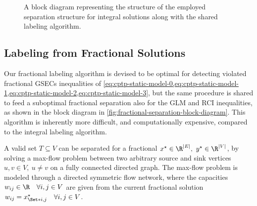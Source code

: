 \begin{figure}[ht]
	\centering
	\caption{A block diagram representing the structure
		of the employed separation structure for integral solutions
		along with the shared labeling algorithm.
	}
	\label{fig:integral-separation-block-diagram}
\end{figure}

\subsection{Labeling from Fractional Solutions}
\label{sec:impl-labeling-fractional-solutions}

Our fractional labeling algorithm is devised to be optimal for
detecting violated fractional GSECs inequalities
of \cref{eq:cptp-static-model-0,eq:cptp-static-model-1,eq:cptp-static-model-2,eq:cptp-static-model-3},
but the same procedure is shared
to feed a suboptimal fractional separation also for the GLM and RCI inequalities,
as shown in the block diagram in \cref{fig:fractional-separation-block-diagram}.
This algorithm is inherently more difficult, and computationally expensive,
compared to the integral labeling algorithm.

A valid set $T \subseteq V$ can be separated for a fractional $x^\star \in \R^{|E|},\ y^\star \in \R^{|V|}$,
by solving a
max-flow problem between two arbitrary source and sink vertices $u, v \in V,\ u \ne v$ on a fully connected directed graph.
The max-flow problem is modeled through a directed symmetric flow network,
where the capacities $w_{ij} \in \R \quad \forall i, j \in V$
are given from the current fractional solution $w_{ij} = x^\star_{\Set*{i, j}} \quad \forall i, j \in V$.

